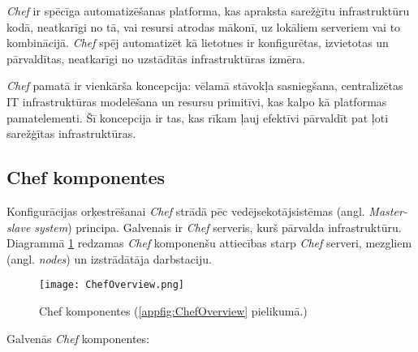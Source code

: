 \textit{Chef} ir spēcīga automatizēšanas platforma, kas apraksta sarežģītu infrastruktūru kodā, neatkarīgi no tā, vai resursi atrodas mākonī, uz lokāliem serveriem vai to kombinācijā. \textit{Chef} spēj automatizēt kā lietotnes ir konfigurētas, izvietotas un pārvaldītas, neatkarīgi no uzstādītās infrastruktūras izmēra.

\textit{Chef} pamatā ir vienkārša koncepcija: vēlamā stāvokļa sasniegšana, centralizētas IT infrastruktūras modelēšana un resursu primitīvi, kas kalpo kā platformas pamatelementi. Šī koncepcija ir tas, kas rīkam ļauj efektīvi pārvaldīt pat ļoti sarežģītas infrastruktūras. \cite{chef-docs}
\subsection{Chef komponentes}
Konfigurācijas orķestrēšanai \textit{Chef} strādā pēc vedējsekotājsistēmas (angl. \textit{Master-slave system}) principa. Galvenais ir \textit{Chef} serveris, kurš pārvalda infrastruktūru.
Diagrammā \ref{fig:ChefOverview} redzamas \textit{Chef} komponenšu attiecības starp \textit{Chef} serveri, mezgliem (angl. \textit{nodes}) un izstrādātāja darbstaciju. \cite{chef-docs}
\begin{figure}[H]%
	\centering
	\captionsetup{justification=centering}
	\texttt{[image: ChefOverview.png]}
	\caption{Chef komponentes (\ref{appfig:ChefOverview} pielikumā.)}
	\label{fig:ChefOverview}
\end{figure}
Galvenās \textit{Chef} komponentes:
